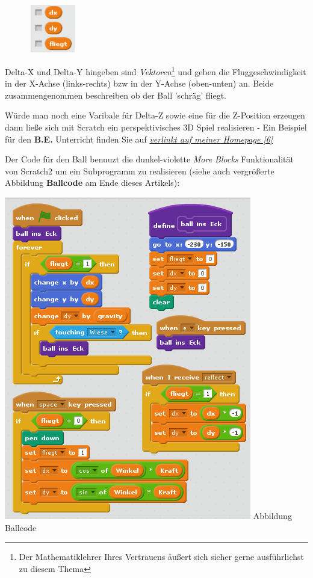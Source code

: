 \begin{figure}
\includegraphics[width=2cm]{scratch/fballvars.png}
\end{figure}
Delta-X und Delta-Y hingeben sind \textit{Vektoren}\footnote{Der Mathematiklehrer Ihres Vertrauens äußert sich sicher gerne ausführlichst zu diesem Thema} und geben die Fluggeschwindigkeit in der X-Achse (links-rechts) bzw in der Y-Achse (oben-unten) an. Beide zusammengenommen beschreiben ob der Ball 'schräg' fliegt. 

Würde man noch eine Varibale für Delta-Z sowie eine für die Z-Position erzeugen dann ließe sich mit Scratch ein perspektivisches 3D Spiel realisieren - Ein Beispiel für den \textbf{B.E.} Unterricht finden Sie auf \href{http://spielend-programmieren.at/en:tutorials:centralperspective}{\textit{verlinkt auf meiner Homepage [6]}}

Der Code für den Ball benuuzt die dunkel-violette \textit{More Blocks} Funktionalität von Scratch2 um ein Subprogramm zu realisieren 
(siehe auch vergrößerte Abbildung \textbf{Ballcode} am Ende dieses Artikels):
\begin{center}
\includegraphics[width=\linewidth]{scratch/fballcode.png}
\footnotesize{Abbildung Ballcode}
\end{center}

